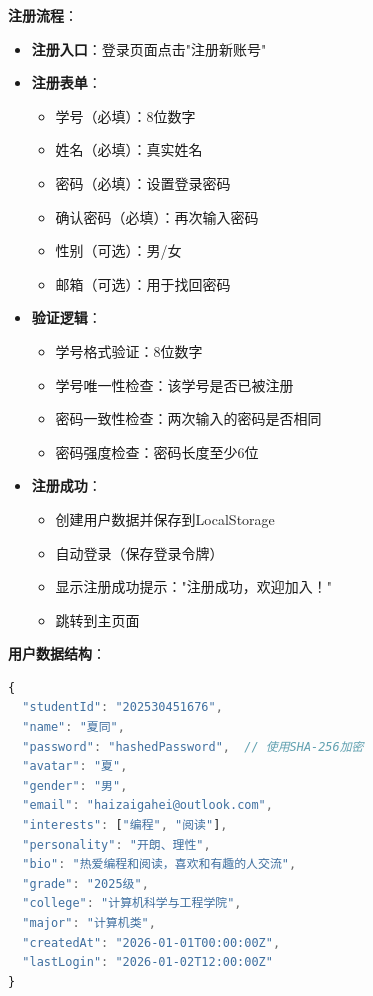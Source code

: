 \documentclass[12pt,a4paper]{article}
\begin{document}
\textbf{注册流程}：
\begin{itemize}
    \item \textbf{注册入口}：登录页面点击"注册新账号"
    \item \textbf{注册表单}：
        \begin{itemize}
            \item 学号（必填）：8位数字
            \item 姓名（必填）：真实姓名
            \item 密码（必填）：设置登录密码
            \item 确认密码（必填）：再次输入密码
            \item 性别（可选）：男/女
            \item 邮箱（可选）：用于找回密码
        \end{itemize}
    \item \textbf{验证逻辑}：
        \begin{itemize}
            \item 学号格式验证：8位数字
            \item 学号唯一性检查：该学号是否已被注册
            \item 密码一致性检查：两次输入的密码是否相同
            \item 密码强度检查：密码长度至少6位
        \end{itemize}
    \item \textbf{注册成功}：
        \begin{itemize}
            \item 创建用户数据并保存到LocalStorage
            \item 自动登录（保存登录令牌）
            \item 显示注册成功提示："注册成功，欢迎加入！"
            \item 跳转到主页面
        \end{itemize}
\end{itemize}

\textbf{用户数据结构}：
\begin{lstlisting}[language=JavaScript]
{
  "studentId": "202530451676",
  "name": "夏同",
  "password": "hashedPassword",  // 使用SHA-256加密
  "avatar": "夏",
  "gender": "男",
  "email": "haizaigahei@outlook.com",
  "interests": ["编程", "阅读"],
  "personality": "开朗、理性",
  "bio": "热爱编程和阅读，喜欢和有趣的人交流",
  "grade": "2025级",
  "college": "计算机科学与工程学院",
  "major": "计算机类",
  "createdAt": "2026-01-01T00:00:00Z",
  "lastLogin": "2026-01-02T12:00:00Z"
}
\end{lstlisting}
\end{document}
